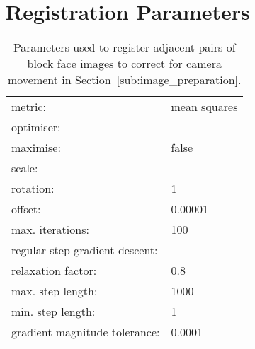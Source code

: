 \appendix
\dblspace

\chapter{Registration Parameters} %
\label{cha:registration_parameters}
  \begin{table}[h]
    \centering
    \begin{tabular}{|ll|}
      \hline
      metric: & mean squares \\
      \multicolumn{2}{|l|}{optimiser:} \\
      \quad maximise: & false\\
      \multicolumn{2}{|l|}{\quad scale:} \\
      \quad\quad rotation: & 1 \\
      \quad\quad offset: & 0.00001 \\
      \quad max. iterations: & 100 \\
      \multicolumn{2}{|l|}{\quad regular step gradient descent:} \\
      \quad\quad relaxation factor: & 0.8 \\
      \quad\quad max. step length: & 1000 \\
      \quad\quad min. step length: & 1 \\
      \quad\quad gradient magnitude tolerance: & 0.0001 \\
      \hline
    \end{tabular}
    
    \caption{Parameters used to register adjacent pairs of block face images to correct for camera movement in Section~\ref{sub:image_preparation}.}
  \end{table}
  
